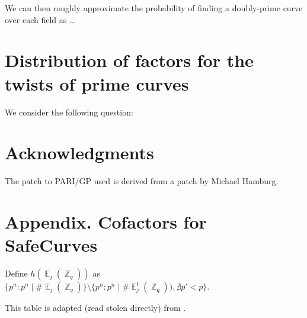 \documentclass[11pt,fleqn]{article}
\newcommand{\Ej}{\ensuremath{\BbbE_j(\BbbZ_q)} }
\newcommand{\Ejt}{\ensuremath{\BbbE^t_j(\BbbZ_q))} }
\begin{document}
We can then roughly approximate the probability of finding a doubly-prime
curve over each field as \dots

\section{Distribution of factors for the twists of prime curves}

We consider the following question: 

\section{Acknowledgments}

The patch to PARI/GP used is derived from a patch by Michael Hamburg.

\section*{Appendix. Cofactors for SafeCurves}


Define $h(\Ej)$ as $\lbrace p^n : p^n \mid \#\Ej \rbrace \setminus \lbrace p^n : p^n \mid \#\Ejt,
\nexists p' < p\rbrace$.

This table is adapted (read stolen directly) from \cite{safecurves}.
\end{document}
